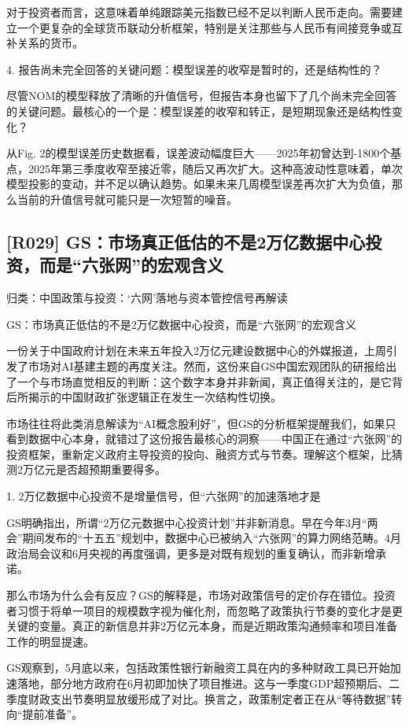 \documentclass[11pt]{ctexart}
\begin{document}
对于投资者而言，这意味着单纯跟踪美元指数已经不足以判断人民币走向。需要建立一个更复杂的全球货币联动分析框架，特别是关注那些与人民币有间接竞争或互补关系的货币。

4. 报告尚未完全回答的关键问题：模型误差的收窄是暂时的，还是结构性的？

尽管NOM的模型释放了清晰的升值信号，但报告本身也留下了几个尚未完全回答的关键问题。最核心的一个是：模型误差的收窄和转正，是短期现象还是结构性变化？

从Fig. 2的模型误差历史数据看，误差波动幅度巨大——2025年初曾达到-1800个基点，2025年第三季度收窄至接近零，随后又再次扩大。这种高波动性意味着，单次模型投影的变动，并不足以确认趋势。如果未来几周模型误差再次扩大为负值，那么当前的升值信号就可能只是一次短暂的噪音。

\subsection{[R029] GS：市场真正低估的不是2万亿数据中心投资，而是“六张网”的宏观含义}
{\small\color{refgray}归类：中国政策与投资：‘六网’落地与资本管控信号再解读}

GS：市场真正低估的不是2万亿数据中心投资，而是“六张网”的宏观含义

一份关于中国政府计划在未来五年投入2万亿元建设数据中心的外媒报道，上周引发了市场对AI基建主题的再度关注。然而，这份来自GS中国宏观团队的研报给出了一个与市场直觉相反的判断：这个数字本身并非新闻，真正值得关注的，是它背后所揭示的中国财政扩张逻辑正在发生一次结构性切换。

市场往往将此类消息解读为“AI概念股利好”，但GS的分析框架提醒我们，如果只看到数据中心本身，就错过了这份报告最核心的洞察——中国正在通过“六张网”的投资框架，重新定义政府主导投资的投向、融资方式与节奏。理解这个框架，比猜测2万亿元是否超预期重要得多。

1. 2万亿数据中心投资不是增量信号，但“六张网”的加速落地才是

GS明确指出，所谓“2万亿元数据中心投资计划”并非新消息。早在今年3月“两会”期间发布的“十五五”规划中，数据中心已被纳入“六张网”的算力网络范畴。4月政治局会议和6月央视的再度强调，更多是对既有规划的重复确认，而非新增承诺。

那么市场为什么会有反应？GS的解释是，市场对政策信号的定价存在错位。投资者习惯于将单一项目的规模数字视为催化剂，而忽略了政策执行节奏的变化才是更关键的变量。真正的新信息并非2万亿元本身，而是近期政策沟通频率和项目准备工作的明显提速。

GS观察到，5月底以来，包括政策性银行新融资工具在内的多种财政工具已开始加速落地，部分地方政府在6月初即加快了项目推进。这与一季度GDP超预期后、二季度财政支出节奏明显放缓形成了对比。换言之，政策制定者正在从“等待数据”转向“提前准备”。
\end{document}
